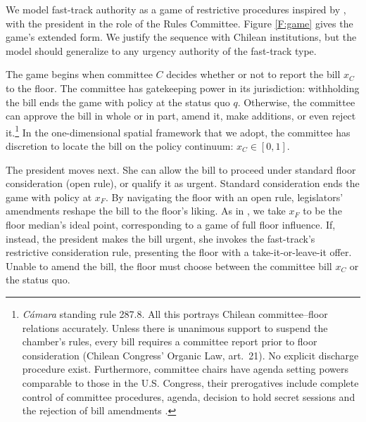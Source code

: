 \documentclass[letter,12pt]{article}
\begin{document}
We model fast-track authority as a game of restrictive procedures inspired by \citet{dion.huber.1996}, with the president in the role of the Rules Committee. Figure \ref{F:game} gives the game's extended form. We justify the sequence with Chilean institutions, but the model should generalize to any urgency authority of the fast-track type. 

The game begins when committee $C$ decides whether or not to report the bill $x_C$ to the floor. The committee has gatekeeping power in its jurisdiction: withholding the bill ends the game with policy at the status quo $q$. Otherwise, the committee can approve the bill in whole or in part, amend it, make additions, or even reject it.\footnote{\emph{Cámara} standing rule 287.8. All this portrays Chilean committee--floor relations accurately. Unless there is unanimous support to suspend the chamber's rules, every bill requires a committee report prior to floor consideration (Chilean Congress' Organic Law, art.~21). No explicit discharge procedure exist. Furthermore, committee chairs have agenda setting powers comparable to those in the U.S. Congress, their prerogatives include complete control of committee procedures, agenda, decision to hold secret sessions and the rejection of bill amendments \citep{danesi.2010, aleman.navia.UrgChi.2009,sotoCongChile2015}.}\label{fn:comm-chains} In the one-dimensional spatial framework that we adopt, the committee has discretion to locate the bill on the policy continuum: $x_C \in [0,1]$.

The president moves next. She can allow the bill to proceed under standard floor consideration (open rule), or qualify it as urgent. Standard consideration ends the game with policy at $x_F$. By navigating the floor with an open rule, legislators' amendments reshape the bill to the floor's liking. As in \citet{shepsle.1979}, we take $x_F$ to be the floor median's ideal point, corresponding to a game of full floor influence. If, instead, the president makes the bill urgent, she invokes the fast-track's restrictive consideration rule, presenting the floor with a take-it-or-leave-it offer. Unable to amend the bill, the floor must choose between the committee bill $x_C$ or the status quo.
  
\end{document}

